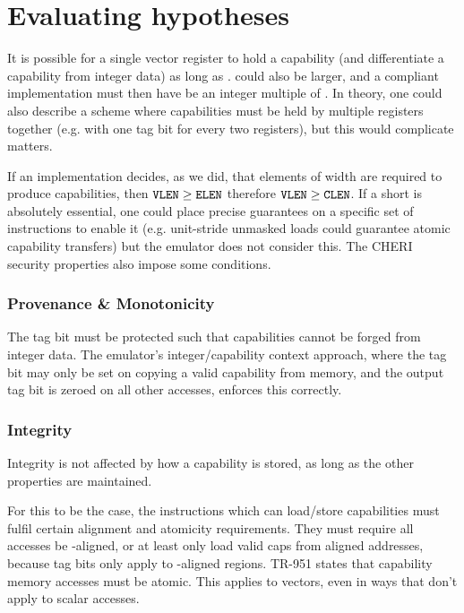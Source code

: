 \section{Evaluating hypotheses}

It is possible for a single vector register to hold a capability (and differentiate a capability from integer data) as long as .
 could also be larger, and a compliant implementation must then have  be an integer multiple of .
In theory, one could also describe a scheme where capabilities must be held by multiple registers together (e.g.  with one tag bit for every two registers), but this would complicate matters.

If an implementation decides, as we did, that elements of width  are required to produce capabilities, then ${\texttt{VLEN}} \ge {\texttt{ELEN}}$ therefore ${\texttt{VLEN}} \ge {\texttt{CLEN}}$.
If a short  is absolutely essential, one could place precise guarantees on a specific set of instructions to enable it (e.g.  unit-stride unmasked loads could guarantee atomic capability transfers) but the emulator does not consider this.
The CHERI security properties also impose some conditions.

\subsubsection*{Provenance \& Monotonicity}
The tag bit must be protected such that capabilities cannot be forged from integer data.
The emulator's integer/capability context approach, where the tag bit may only be set on copying a valid capability from memory, and the output tag bit is zeroed on all other accesses, enforces this correctly.

\subsubsection*{Integrity}
Integrity is not affected by how a capability is stored, as long as the other properties are maintained.

\label{chap:capinvec:hyp_load_store}
For this to be the case, the instructions which can load/store capabilities must fulfil certain alignment and atomicity requirements.
They must require all accesses be -aligned, or at least only load valid caps from aligned addresses, because tag bits only apply to -aligned regions.
TR-951 states that capability memory accesses must be atomic\cite[Section 11.3]{TR-951}.
This applies to vectors, even in ways that don't apply to scalar accesses.

